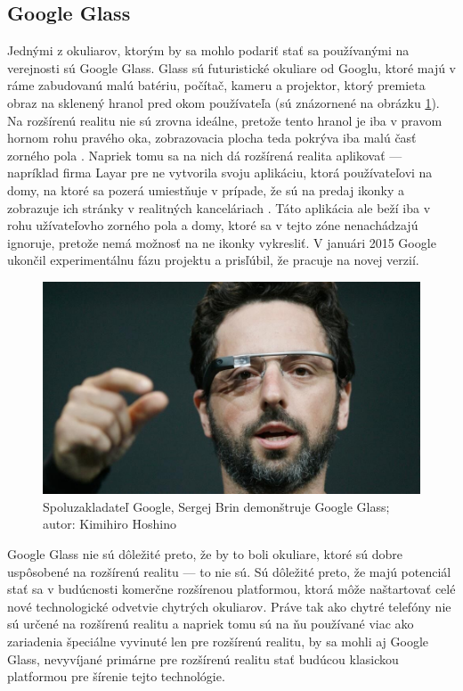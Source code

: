 \subsection{Google Glass}

Jednými z okuliarov, ktorým by sa mohlo podariť stať sa používanými na verejnosti sú Google Glass. Glass sú futuristické okuliare od Googlu, ktoré majú v ráme zabudovanú malú batériu, počítač, kameru a projektor, ktorý premieta obraz na sklenený hranol pred okom používateľa (sú znázornené na obrázku \ref{glass}). Na rozšírenú realitu nie sú zrovna ideálne, pretože tento hranol je iba v pravom hornom rohu pravého oka, zobrazovacia plocha teda pokrýva iba malú časť zorného pola \cite{Google14-b}. Napriek tomu sa na nich dá rozšírená realita aplikovať — napríklad firma Layar pre ne vytvorila svoju aplikáciu, ktorá používateľovi na domy, na ktoré sa pozerá umiestňuje v prípade, že sú na predaj ikonky a zobrazuje ich stránky v realitných kanceláriach \cite{LayarAR}. Táto aplikácia ale beží iba v rohu užívateľovho zorného pola a domy, ktoré sa v tejto zóne nenachádzajú ignoruje, pretože nemá možnosť na ne ikonky vykresliť. V januári 2015 Google ukončil experimentálnu fázu projektu a prisľúbil, že pracuje na novej verzií.

\begin{figure}[h]
 \centering
 \includegraphics[max width=\textwidth]{pictures/bringlass.jpg}
 \caption{Spoluzakladateľ Google, Sergej Brin demonštruje Google Glass; autor: Kimihiro Hoshino}
 \label{glass}
 \end{figure}

Google Glass nie sú dôležité preto, že by to boli okuliare, ktoré sú dobre uspôsobené na rozšírenú realitu — to nie sú. Sú dôležité preto, že majú potenciál stať sa v budúcnosti komerčne rozšírenou platformou, ktorá môže naštartovať celé nové technologické odvetvie chytrých okuliarov. Práve tak ako chytré telefóny nie sú určené na rozšírenú realitu a napriek tomu sú na ňu používané viac ako zariadenia špeciálne vyvinuté len pre rozšírenú realitu, by sa mohli aj Google Glass, nevyvíjané primárne pre rozšírenú realitu stať budúcou klasickou platformou pre šírenie tejto technológie.

